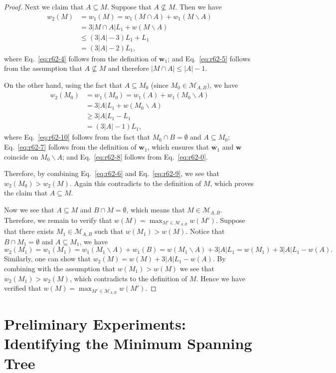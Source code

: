 \documentclass{article}
\newcommand{\M}{\mathcal M}
\newcommand{\del}{\backslash}
\renewcommand{\vec}[1]{\boldsymbol{#1}}
\begin{document}
\begin{proof}
Next we claim that $A \subseteq M$. Suppose that $A\not\subseteq M$. 
Then we have
\begin{align}
	w_2(M) &= w_1(M) = w_1(M\cap A)+w_1(M\del A) \nonumber \\
				 &= 3|M\cap A| L_1 + w(M\del A) \label{eq:r62-4}\\
				 &\le (3|A|-3) L_1+L_1 \label{eq:r62-5}\\
				 &= (3|A|-2)L_1, \label{eq:r62-6}
\end{align}
where Eq.~\eqref{eq:r62-4} follows from the definition of $\vec w_1$;
and Eq.~\eqref{eq:r62-5} follows from the assumption that $A\not\subseteq M$ and therefore $|M\cap A| \le |A|-1$.

On the other hand, using the fact that $A\subseteq M_0$ (since $M_0\in \M_{A,B})$, we have
\begin{align}
w_2(M_0) &= w_1(M_0) = w_1(A)+w_1(M_0 \del A) \label{eq:r62-10}\\
	 		   &= 3|A| L_1+w(M_0\del A)\label{eq:r62-7}\\
	 		   &\ge 3|A| L_1-L_1\label{eq:r62-8}\\
	 		   &= (3|A|-1)L_1, \label{eq:r62-9} 	 		   
\end{align}
where Eq.~\eqref{eq:r62-10} follows from the fact that $M_0\cap B=\emptyset$ and $A\subseteq M_0$;
Eq.~\eqref{eq:r62-7} follows from the definition of $\vec w_1$, which ensures that $\vec w_1$ and $\vec w$ coincide on $M_0\del A$;
and Eq.~\eqref{eq:r62-8} follows from Eq.~\eqref{eq:r62-0}.

Therefore, by combining Eq.~\eqref{eq:r62-6} and Eq.~\eqref{eq:r62-9}, we see that $w_2(M_0) > w_2(M)$. 
Again this contradicts to the definition of $M$, which proves the claim that $A \subseteq M$.


Now we see that $A\subseteq M$ and $B\cap M = \emptyset$, which means that $M\in \M_{A,B}$. 
Therefore, we remain to verify that $w(M) = \max_{M'\in\M_{A,B}} w(M')$.
Suppose that there exists $M_1\in \M_{A,B}$ such that $w(M_1) > w(M)$.
Notice that $B\cap M_1=\emptyset$ and $A\subseteq M_1$, we have
$$
w_2(M_1) = w_1(M_1) = w_1(M_1\del A)+w_1(B) = w(M_1\del A)+3|A|L_1 = w(M_1)+3|A|L_1-w(A).
$$
Similarly, one can show that $w_2(M) = w(M)+3|A|L_1-w(A)$.
By combining with the assumption that $w(M_1) > w(M)$
we see that $w_2(M_1) > w_2(M)$, which contradicts to the definition of $M$. 
Hence we have verified that $w(M) = \max_{M'\in\M_{A,B}} w(M')$.
\end{proof}

\section{Preliminary Experiments: Identifying the Minimum Spanning Tree}
\label{section:experiment}
\end{document}
